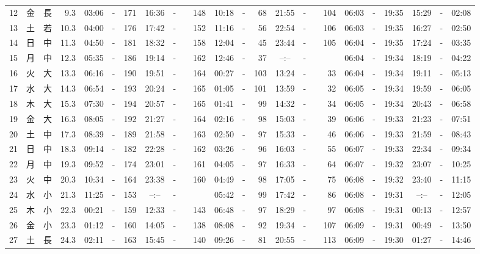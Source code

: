 \documentclass[12pt,a4j]{jsarticle}
\begin{document}
\begin{table}[htbp]
\begin{center}
{\begin{tabular}{|rc|cr|ccrccr|ccrccr|ccc|ccc|}
12 & 金 & 長 &  9.3 &  03:06 &-& 171 &  16:36 &-& 148 &  10:18 &-&  68 &  21:55 &-& 104 & 06:03 & -& 19:35 & 15:29 & -& 02:08 \\
13 & 土 & 若 & 10.3 &  04:00 &-& 176 &  17:42 &-& 152 &  11:16 &-&  56 &  22:54 &-& 106 & 06:03 & -& 19:35 & 16:27 & -& 02:50 \\
14 & 日 & 中 & 11.3 &  04:50 &-& 181 &  18:32 &-& 158 &  12:04 &-&  45 &  23:44 &-& 105 & 06:04 & -& 19:35 & 17:24 & -& 03:35 \\
15 & 月 & 中 & 12.3 &  05:35 &-& 186 &  19:14 &-& 162 &  12:46 &-&  37 &  --:-- &-&~~~~~ & 06:04 & -& 19:34 & 18:19 & -& 04:22 \\
16 & 火 & 大 & 13.3 &  06:16 &-& 190 &  19:51 &-& 164 &  00:27 &-& 103 &  13:24 &-&  33 & 06:04 & -& 19:34 & 19:11 & -& 05:13 \\
17 & 水 & 大 & 14.3 &  06:54 &-& 193 &  20:24 &-& 165 &  01:05 &-& 101 &  13:59 &-&  32 & 06:05 & -& 19:34 & 19:59 & -& 06:05 \\
18 & 木 & 大 & 15.3 &  07:30 &-& 194 &  20:57 &-& 165 &  01:41 &-&  99 &  14:32 &-&  34 & 06:05 & -& 19:34 & 20:43 & -& 06:58 \\
19 & 金 & 大 & 16.3 &  08:05 &-& 192 &  21:27 &-& 164 &  02:16 &-&  98 &  15:03 &-&  39 & 06:06 & -& 19:33 & 21:23 & -& 07:51 \\
20 & 土 & 中 & 17.3 &  08:39 &-& 189 &  21:58 &-& 163 &  02:50 &-&  97 &  15:33 &-&  46 & 06:06 & -& 19:33 & 21:59 & -& 08:43 \\
21 & 日 & 中 & 18.3 &  09:14 &-& 182 &  22:28 &-& 162 &  03:26 &-&  96 &  16:03 &-&  55 & 06:07 & -& 19:33 & 22:34 & -& 09:34 \\
22 & 月 & 中 & 19.3 &  09:52 &-& 174 &  23:01 &-& 161 &  04:05 &-&  97 &  16:33 &-&  64 & 06:07 & -& 19:32 & 23:07 & -& 10:25 \\
23 & 火 & 中 & 20.3 &  10:34 &-& 164 &  23:38 &-& 160 &  04:49 &-&  98 &  17:05 &-&  75 & 06:08 & -& 19:32 & 23:40 & -& 11:15 \\
24 & 水 & 小 & 21.3 &  11:25 &-& 153 &  --:-- &-&~~~~~ &  05:42 &-&  99 &  17:42 &-&  86 & 06:08 & -& 19:31 & --:-- & -& 12:05 \\
25 & 木 & 小 & 22.3 &  00:21 &-& 159 &  12:33 &-& 143 &  06:48 &-&  97 &  18:29 &-&  97 & 06:08 & -& 19:31 & 00:13 & -& 12:57 \\
26 & 金 & 小 & 23.3 &  01:12 &-& 160 &  14:05 &-& 138 &  08:08 &-&  92 &  19:34 &-& 107 & 06:09 & -& 19:31 & 00:49 & -& 13:50 \\
27 & 土 & 長 & 24.3 &  02:11 &-& 163 &  15:45 &-& 140 &  09:26 &-&  81 &  20:55 &-& 113 & 06:09 & -& 19:30 & 01:27 & -& 14:46 \\

\end{tabular}}
\end{center}
\end{table}
\end{document}
